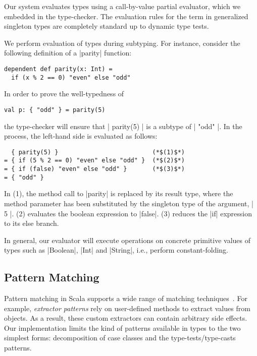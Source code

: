 Our system evaluates types using a call-by-value partial evaluator, which we embedded in the type-checker.
The evaluation rules for the term in generalized singleton types are completely standard up to dynamic type tests.

We perform evaluation of types during subtyping.
For instance, consider the following definition of a |parity| function:

\begin{lstlisting}
dependent def parity(x: Int) =
  if (x % 2 == 0) "even" else "odd"
\end{lstlisting}

\noindent
In order to prove the well-typedness of

\begin{lstlisting}
val p: { "odd" } = parity(5)
\end{lstlisting}

\noindent
the type-checker will ensure that |{ parity(5) }| is a subtype of |{ "odd" }|.
In the process, the left-hand side is evaluated as follows:

\begin{lstlisting}
  { parity(5) }                          (*$(1)$*)
= { if (5 % 2 == 0) "even" else "odd" }  (*$(2)$*)
= { if (false) "even" else "odd" }       (*$(3)$*)
= { "odd" }
\end{lstlisting}

\noindent
In (1), the method call to |parity| is replaced by its result type, where the method parameter has been substituted by the singleton type of the argument, |{ 5 }|.
(2) evaluates the boolean expression to |false|.
(3) reduces the |if| expression to its else branch.

In general, our evaluator will execute operations on concrete primitive values of types such as |Boolean|, |Int| and |String|, i.e., perform constant-folding.

\subsection{Pattern Matching}
\label{pattern-matching}

Pattern matching in Scala supports a wide range of matching techniques~\citep{emir2007matching}.
For example, \emph{extractor patterns} rely on user-defined methods to extract values from objects.
As a result, these custom extractors can contain arbitrary side effects.
Our implementation limits the kind of patterns available in types to the two simplest forms: decomposition of case classes and the type-tests/type-casts patterns.

